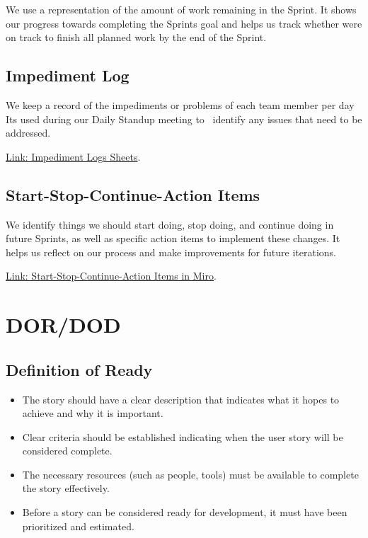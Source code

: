 \documentclass{article}
\providecommand{\tightlist}{
  \setlength{\itemsep}{0pt}\setlength{\parskip}{0pt}}
\begin{document}
We use a representation of the amount of work remaining in the Sprint.
It shows our progress towards completing the Sprint\textquotesingle s
goal and helps us track whether we\textquotesingle re on track to finish
all planned work by the end of the Sprint.

\hypertarget{impedimentlog}{
\subsection{\texorpdfstring{\textbf{Impediment
Log}}{Impediment Log}}\label{impedimentlog}}

We keep a record of the impediments or problems of each team member per
day It\textquotesingle s used during our Daily Standup meeting to
~identify any issues that need to be addressed.

\href{https://jalafoundation.sharepoint.com/:f:/s/CoffeeTime/EvrueabkwZZPn-vQxfzknlcBg55BRdrfIEqUw9mxtrYNWg?e=JVZHfq}{Link: Impediment Logs Sheets}.


\hypertarget{startstopcontinueactionitems}{
\subsection{\texorpdfstring{\textbf{Start-Stop-Continue-Action
Items}}{Start-Stop-Continue-Action Items}}\label{startstopcontinueactionitems}}

We identify things we should start doing, stop doing, and continue doing
in future Sprints, as well as specific action items to implement these
changes. It helps us reflect on our process and make improvements for
future iterations.

\href{https://miro.com/app/board/uXjVKDO7l8M=/?share_link_id=7422815223}{Link: Start-Stop-Continue-Action Items in Miro}.

\newpage

\hypertarget{dordod}{
\section{DOR/DOD}\label{dordod}}

\hypertarget{definitionofready}{
\subsection{\texorpdfstring{\textbf{Definition of
Ready}}{Definition of Ready}}\label{definitionofready}}

\begin{itemize}
\tightlist
\item
  The story should have a clear description that indicates what it hopes
  to achieve and why it is important.
\item
  Clear criteria should be established indicating when the user story
  will be considered complete.
\item
  The necessary resources (such as people, tools) must be available to
  complete the story effectively.
\item
  Before a story can be considered ready for development, it must have
  been prioritized and estimated.
\end{itemize}
\end{document}
